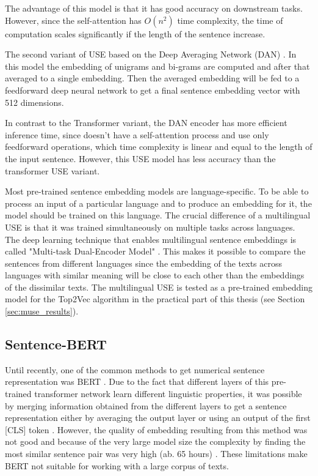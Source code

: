 \documentclass[fontsize=12pt,a4paper,twoside,openany]{scrbook}
\begin{document}
The advantage of this model is that it has good accuracy on downstream tasks. However, since the self-attention has \(O(n^2)\) time complexity, the time of computation scales significantly if the length of the sentence increase.

The second variant of USE based on the Deep Averaging Network (DAN) \parencite{Iyyer15}. In this model the embedding of unigrams and bi-grams are computed and after that averaged to a single embedding. Then the averaged embedding will be fed to a feedforward deep neural network to get a final sentence embedding vector with 512 dimensions.

In contrast to the Transformer variant, the DAN encoder has more efficient inference time, since doesn't have a self-attention process and use only feedforward operations, which time complexity is linear and equal to the length of the input sentence. However, this USE model has less accuracy than the transformer USE variant. 

Most pre-trained sentence embedding models are language-specific. To be able to process an input of a particular language and to produce an embedding for it, the model should be trained on this language. The crucial difference of a multilingual USE is that it was trained simultaneously on multiple tasks across languages. The deep learning technique that enables multilingual sentence embeddings is called "Multi-task Dual-Encoder Model" \parencite{Chidambaram19}. This makes it possible to compare the sentences from different languages since the embedding of the texts across languages with similar meaning will be close to each other than the embeddings of the dissimilar texts. 
The multilingual USE is tested as a pre-trained embedding model for the Top2Vec algorithm in the practical part of this thesis (see Section \ref{sec:muse_results}).

\subsection{Sentence-BERT}
\label{sec:sbert}

Until recently, one of the common methods to get numerical sentence representation was BERT \parencite{Devlin19}. Due to the fact that different layers of this pre-trained transformer network learn different linguistic properties, it was possible by merging information obtained from the different layers to get a sentence representation either by averaging the output layer or using an output of the first [CLS] token \parencite{Wang20}. However, the quality of embedding resulting from this method was not good and because of the very large model size the complexity by finding the most similar sentence pair was very high (ab. 65 hours) \parencite{Reimers19}. These limitations make BERT not suitable for working with a large corpus of texts.
\end{document}
